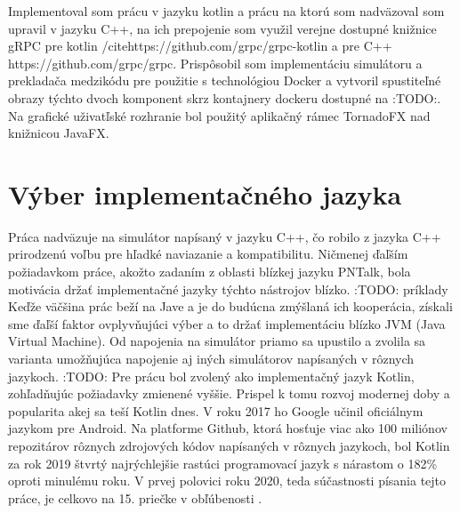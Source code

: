 Implementoval som prácu v jazyku kotlin a prácu na ktorú som nadväzoval som upravil v jazyku C++, na ich prepojenie som využil verejne dostupné knižnice gRPC pre kotlin /cite{}https://github.com/grpc/grpc-kotlin a pre C++ \cite{}https://github.com/grpc/grpc. Prispôsobil som implementáciu simulátoru a prekladača medzikódu pre použitie s technológiou Docker a vytvoril spustiteľné obrazy týchto dvoch komponent skrz kontajnery dockeru dostupné na :TODO:. Na grafické uživatľské rozhranie bol použitý aplikačný rámec TornadoFX nad knižnicou JavaFX.

\section{Výber implementačného jazyka}

Práca nadväzuje na simulátor napísaný v jazyku C++, čo robilo z jazyka C++ prirodzenú voľbu pre hľadké naviazanie a kompatibilitu. Ničmenej ďaľším požiadavkom práce, akožto zadaním z oblasti blízkej jazyku PNTalk, bola motivácia držať implementačné jazyky týchto nástrojov blízko. :TODO: príklady Keďže väčšina prác beží na Jave a je do budúcna zmýšlaná ich kooperácia, získali sme ďaľší faktor ovplyvňujúci výber a to držať implementáciu blízko JVM (Java Virtual Machine). Od napojenia na simulátor priamo sa upustilo a zvolila sa varianta umožňujúca napojenie aj iných simulátorov napísaných v rôznych jazykoch. :TODO: Pre prácu bol zvolený ako implementačný jazyk Kotlin, zohľadňujúc požiadavky zmienené vyššie. Prispel k tomu rozvoj modernej doby a popularita akej sa teší Kotlin dnes. V roku 2017 ho Google učinil oficiálnym jazykom pre Android. \cite{tornadofx} Na platforme Github, ktorá hosťuje viac ako 100 miliónov repozitárov rôznych zdrojových kódov napísaných v rôznych jazykoch, bol Kotlin za rok 2019 štvrtý najrýchlejšie rastúci programovací jazyk s nárastom o 182\% oproti minulému roku. \cite{githuboctoverse}
V prvej polovici roku 2020, teda súčastnosti písania tejto práce, je celkovo na 15. priečke v obľúbenosti \cite{githubstats}.


